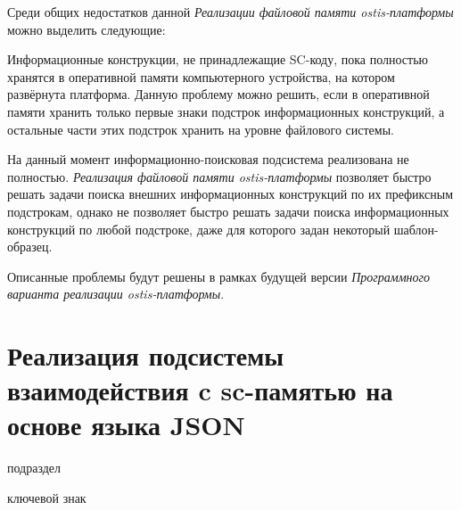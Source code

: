 Среди общих недостатков данной \textit{Реализации файловой памяти ostis-платформы} можно выделить следующие:
\begin{textitemize}
    \item Информационные конструкции, не принадлежащие SC-коду, пока полностью хранятся в оперативной памяти компьютерного устройства, на котором развёрнута платформа. Данную проблему можно решить, если в оперативной памяти хранить только первые знаки подстрок информационных конструкций, а остальные части этих подстрок хранить на уровне файлового системы.
    \item На данный момент информационно-поисковая подсистема реализована не полностью. \textit{Реализация файловой памяти ostis-платформы} позволяет быстро решать задачи поиска внешних информационных конструкций по их префиксным подстрокам, однако не позволяет быстро решать задачи поиска информационных конструкций по любой подстроке, даже для которого задан некоторый шаблон-образец.
\end{textitemize}

Описанные проблемы будут решены в рамках будущей версии \textit{Программного варианта реализации ostis-платформы}.

\section{Реализация подсистемы взаимодействия c sc-памятью на основе языка JSON}
\label{sec_soft_platform_sc_server_subsystem}

\begin{SCn}

\begin{scnrelfromlist}{подраздел}
\end{scnrelfromlist}

\begin{scnrelfromlist}{ключевой знак}
\end{scnrelfromlist}

\end{SCn}

